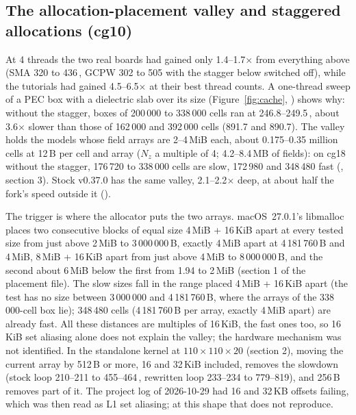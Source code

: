 \subsection{The allocation-placement valley and staggered allocations (cg10)}\label{sec:valley}
At 4 threads the two real boards had gained only 1.4--1.7$\times$ from everything above (SMA 320 to 436\,\MC, GCPW
302 to 505 with the stagger below switched off), while the tutorials had gained 4.5--6.5$\times$ at their best thread
counts. A one-thread sweep of a PEC box with a dielectric slab over its size (Figure~\ref{fig:cache},
) shows why: without the stagger, boxes of 200\,000 to 338\,000 cells ran
at 246.8--249.5\,\MC, about 3.6$\times$ slower than those of 162\,000 and 392\,000 cells (891.7 and 890.7). The
valley holds the models whose field arrays are 2--4\,MiB each, about 0.175--0.35 million cells at 12\,B per cell and
array ($N_z$ a multiple of 4; 4.2--8.4\,MB of fields): on cg18 without the stagger, 176\,720 to 338\,000
cells are slow, 172\,980 and 348\,480 fast (, section 3).
Stock v0.37.0 has the same valley, 2.1--2.2$\times$ deep, at about half the fork's speed outside it
().

The trigger is where the allocator puts the two arrays. macOS~27.0.1's libmalloc places two consecutive
 blocks of equal size 4\,MiB + 16\,KiB apart at every tested size from just above 2\,MiB to
3\,000\,000\,B, exactly 4\,MiB apart at 4\,181\,760\,B and 4\,MiB, 8\,MiB + 16\,KiB apart from just above 4\,MiB to
8\,000\,000\,B, and the second about 6\,MiB below the first from 1.94 to 2\,MiB (section 1 of the placement file).
The slow sizes fall in the range placed 4\,MiB + 16\,KiB apart (the test has no size between 3\,000\,000 and
4\,181\,760\,B, where the arrays of the 338\,000-cell box lie); 348\,480 cells (4\,181\,760\,B per array, exactly
4\,MiB apart) are already fast. All these distances are multiples of 16\,KiB, the fast ones too, so 16\,KiB set aliasing
alone does not explain the valley; the hardware mechanism was not identified. In the standalone kernel at
$110\times110\times20$ (section 2), moving the current array by 512\,B or more, 16 and 32\,KiB included, removes the
slowdown (stock loop 210--211 to 455--464\,\MC, rewritten loop 233--234 to 779--819), and 256\,B removes part of it.
The project log of 2026-10-29 had 16 and 32\,KB offsets failing, which was then read as L1 set aliasing; at this
shape that does not reproduce.

